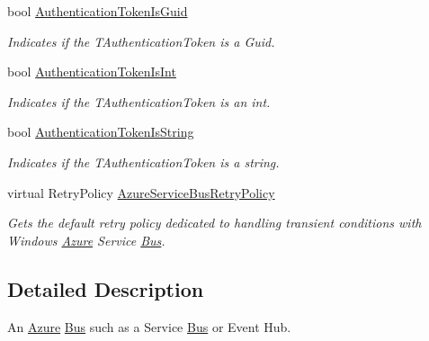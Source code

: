 \begin{DoxyCompactItemize}
bool \hyperlink{classCqrs_1_1Azure_1_1ServiceBus_1_1AzureBus_afc7a8e0c0a739b2a807eacac8f6c5397_afc7a8e0c0a739b2a807eacac8f6c5397}{Authentication\+Token\+Is\+Guid}
\begin{DoxyCompactList}\small\item\em Indicates if the {\itshape T\+Authentication\+Token}  is a Guid. \end{DoxyCompactList}\item 
bool \hyperlink{classCqrs_1_1Azure_1_1ServiceBus_1_1AzureBus_a9ce7d5f1f88f9ccc42093300b7d63a95_a9ce7d5f1f88f9ccc42093300b7d63a95}{Authentication\+Token\+Is\+Int}
\begin{DoxyCompactList}\small\item\em Indicates if the {\itshape T\+Authentication\+Token}  is an int. \end{DoxyCompactList}\item 
bool \hyperlink{classCqrs_1_1Azure_1_1ServiceBus_1_1AzureBus_af23dfd49e2da5aee809b16fc3a43d9d7_af23dfd49e2da5aee809b16fc3a43d9d7}{Authentication\+Token\+Is\+String}
\begin{DoxyCompactList}\small\item\em Indicates if the {\itshape T\+Authentication\+Token}  is a string. \end{DoxyCompactList}\item 
virtual Retry\+Policy \hyperlink{classCqrs_1_1Azure_1_1ServiceBus_1_1AzureBus_a88997183f8e6fa9dcef5b883329e95ce_a88997183f8e6fa9dcef5b883329e95ce}{Azure\+Service\+Bus\+Retry\+Policy}
\begin{DoxyCompactList}\small\item\em Gets the default retry policy dedicated to handling transient conditions with Windows \hyperlink{namespaceCqrs_1_1Azure}{Azure} Service \hyperlink{namespaceCqrs_1_1Bus}{Bus}. \end{DoxyCompactList}\end{DoxyCompactItemize}


\subsection{Detailed Description}
An \hyperlink{namespaceCqrs_1_1Azure}{Azure} \hyperlink{namespaceCqrs_1_1Bus}{Bus} such as a Service \hyperlink{namespaceCqrs_1_1Bus}{Bus} or Event Hub. 


